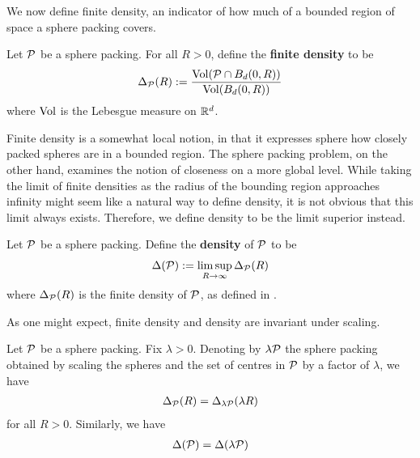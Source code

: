 We now define finite density, an indicator of how much of a bounded region of space a sphere packing covers.

\begin{boxdefinition}\label{Ch2:Def:FiniteDensity}
    Let $\mathcal{P}$ be a sphere packing. For all $R > 0$, define the \textbf{finite density} to be
    \begin{align*}
        \Delta_{\mathcal{P}}(R) := \frac{\operatorname{Vol}\!\left( \mathcal{P} \cap B_d(0, R) \right)}{\operatorname{Vol}\!\left( B_d(0, R) \right)}
    \end{align*}
    where $\operatorname{Vol}$ is the Lebesgue measure on $\mathbb{R}^d$.
\end{boxdefinition}

Finite density is a somewhat local notion, in that it expresses sphere how closely packed spheres are in a bounded region. The sphere packing problem, on the other hand, examines the notion of closeness on a more global level. While taking the limit of finite densities as the radius of the bounding region approaches infinity might seem like a natural way to define density, it is not obvious that this limit always exists. Therefore, we define density to be the limit superior instead.

\begin{boxdefinition}[Density]\label{Ch2:Def:Density}
    Let $\mathcal{P}$ be a sphere packing. Define the \textbf{density} of $\mathcal{P}$ to be
    \begin{align*}
        \Delta(\mathcal{P}) := \limsup_{R \to \infty} \Delta_{\mathcal{P}}(R)
    \end{align*}
    where $\Delta_{\mathcal{P}}(R)$ is the finite density of $\mathcal{P}$, as defined in .
\end{boxdefinition}

As one might expect, finite density and density are invariant under scaling.

\begin{boxproposition}\label{Ch2:Prop:Scaling_Sphere_Packings}
    Let $\mathcal{P}$ be a sphere packing. Fix $\lambda > 0$. Denoting by $\lambda \mathcal{P}$ the sphere packing obtained by scaling the spheres and the set of centres in $\mathcal{P}$ by a factor of $\lambda$, we have
    \begin{align*}
        \Delta_{\mathcal{P}}\!\left( R \right) = \Delta_{\lambda \mathcal{P}}\!\left( \lambda R \right)
    \end{align*}
    for all $R > 0$. Similarly, we have
    \begin{align*}
        \Delta\!\left( \mathcal{P} \right) = \Delta\!\left( \lambda \mathcal{P} \right)
    \end{align*}
\end{boxproposition}

